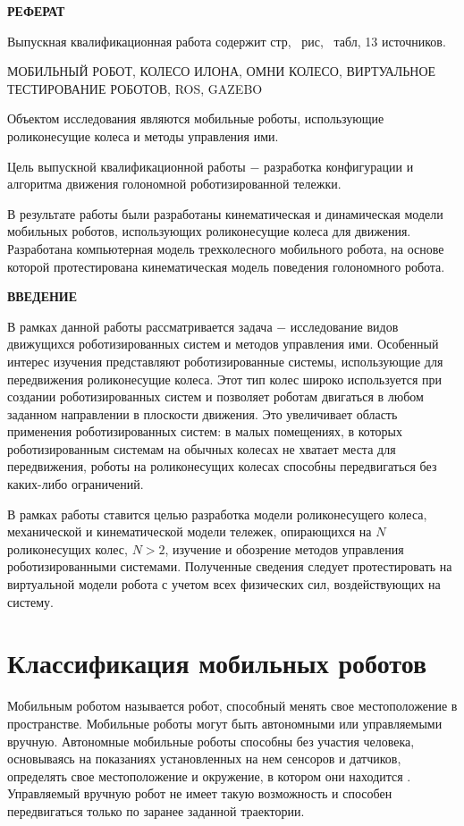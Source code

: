 \documentclass[oneside,final,14pt]{extreport}
\providecommand\totfig{}
\providecommand\tottab{}
\begin{document}
\begin{center}
\bfseries РЕФЕРАТ
\end{center}

Выпускная квалификационная работа содержит \pageref{LastPage} стр, \totfig\ рис, \tottab\ табл, 13 источников.

МОБИЛЬНЫЙ РОБОТ, КОЛЕСО ИЛОНА, ОМНИ КОЛЕСО, ВИРТУАЛЬНОЕ ТЕСТИРОВАНИЕ РОБОТОВ, ROS, GAZEBO

Объектом исследования являются мобильные роботы, использующие роликонесущие колеса и методы управления ими.

Цель выпускной квалификационной работы $-$ разработка конфигурации и алгоритма движения голономной роботизированной тележки.

В результате работы были разработаны кинематическая и динамическая модели мобильных роботов, использующих роликонесущие колеса для движения. Разработана компьютерная модель трехколесного мобильного робота, на основе которой протестирована кинематическая модель поведения голономного робота.

\tableofcontents
\newpage
\begin{center}
\bfseries ВВЕДЕНИЕ
\end{center}

В рамках данной работы рассматривается задача $-$ исследование видов движущихся роботизированных систем и методов управления ими. Особенный интерес изучения представляют роботизированные системы, использующие для передвижения роликонесущие колеса. Этот тип колес широко используется при создании роботизированных систем и позволяет роботам двигаться в любом заданном направлении в плоскости движения. Это увеличивает область применения роботизированных систем: в малых помещениях, в которых роботизированным системам на обычных колесах не хватает места для передвижения, роботы на роликонесущих колесах способны передвигаться без каких-либо ограничений. 

В рамках работы ставится целью разработка модели роликонесущего колеса, механической и кинематической модели тележек, опирающихся на $N$ роликонесущих колес, $N>2$, изучение и обозрение методов управления роботизированными системами. Полученные сведения следует протестировать на виртуальной модели робота с учетом всех физических сил, воздействующих на систему.

\chapter{Классификация мобильных роботов}
Мобильным роботом называется робот, способный менять свое местоположение в пространстве. Мобильные роботы могут быть автономными или управляемыми вручную. Автономные мобильные роботы способны без участия человека, основываясь на показаниях установленных на нем сенсоров и датчиков, определять свое местоположение и окружение, в котором они находится \cite{Siegwart}. Управляемый вручную робот не имеет такую возможность и способен передвигаться только по заранее заданной траектории.
\end{document}
